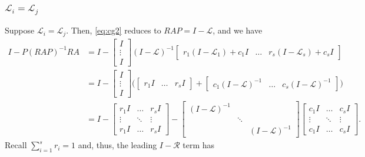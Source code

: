 \documentclass[a4paper,10pt]{article}
\begin{document}
\subsubsection{$\mathcal{L}_i = \mathcal{L}_j$}\label{sec:mg:mg:simp}

Suppose $\mathcal{L}_i = \mathcal{L}_j$. Then, \eqref{eq:cg2} reduces to
$RAP = I - \mathcal{L}$, and we have
%
\begin{align}\nonumber
I - P(RAP)^{-1}RA & = I - \begin{bmatrix} I \\ \vdots \\ I\end{bmatrix}
	(I - \mathcal{L})^{-1}\begin{bmatrix} r_1(I - \mathcal{L}_1) + c_1I
	& \hdots & r_s(I - \mathcal{L}_s) + c_sI\end{bmatrix} \\
& = I - \begin{bmatrix} I \\ \vdots \\ I\end{bmatrix}
	\bigg( \begin{bmatrix} r_1 I  & \hdots & r_s I\end{bmatrix} 
	+ 	\begin{bmatrix} c_1(I - \mathcal{L})^{-1}
	& \hdots & c_s(I - \mathcal{L})^{-1}\end{bmatrix} \bigg) \nonumber \\
& = I - \begin{bmatrix} r_1 I & \hdots & r_s I \\ 
		\vdots & \ddots & \vdots \\
		r_1 I & \hdots & r_s I \end{bmatrix}
	- \begin{bmatrix} (I - \mathcal{L})^{-1} \\ & \ddots \\ && (I - \mathcal{L})^{-1} \end{bmatrix}
	\begin{bmatrix} c_1 I & \hdots & c_s I \\ 
	\vdots & \ddots & \vdots \\
	c_1 I & \hdots & c_s I \end{bmatrix}.
	\label{eq:cgc}
\end{align}
%
Recall $\sum_{i=1}^s r_i = 1$ and, thus, the leading $I - \mathcal{R}$ term has
\end{document}
